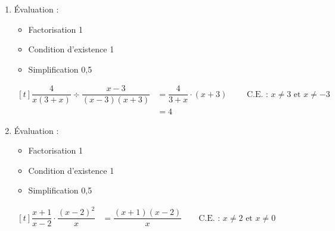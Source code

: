 %
%
    \begin{enumerate}
        \item
        Évaluation :
        \begin{itemize}
            \item Factorisation \hfill 1
            \item Condition d'existence \hfill 1
            \item Simplification \hfill 0,5
        \end{itemize}
              $\begin{aligned}[t]
                      \dfrac{4}{x(3+x)}\div\dfrac{x-3}{(x-3)(x+3)} & = \dfrac{4}{3+x}\cdot (x+3)
                      \qquad\text{ C.E. : }x\ne 3\text{ et } x\ne -3\\
                                                                   & = 4
                  \end{aligned}$
        \item
        Évaluation :
        \begin{itemize}
            \item Factorisation \hfill 1
            \item Condition d'existence \hfill 1
            \item Simplification \hfill 0,5
        \end{itemize}
        $\begin{aligned}[t]
            \dfrac{x+1}{x-2} \cdot \dfrac{(x-2)^2}{x}
            &= \dfrac{(x+1)(x-2)}{x}\qquad\text{C.E. : }x\ne 2 \text{ et } x \ne 0\\
        \end{aligned}$
    \end{enumerate}
